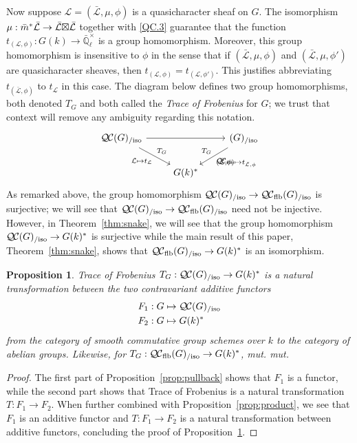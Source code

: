 \documentclass{amsart}
\theoremstyle{plain}
\newtheorem{proposition}[theorem]{Proposition}
\theoremstyle{definition}
\theoremstyle{remark}
\newcommand{\EE}{\mathbb{\bar Q}_\ell}
\newcommand{\Fq}{k}
\newcommand{\EEx}{\EE^\times}
\newcommand{\qcs}[1]{{\mathcal{#1}}}
\newcommand{\gqcs}[1]{{\mathcal{\bar #1}}}
\newcommand{\QC}{{\mathcal{Q\hskip-0.8pt C}}}
\newcommand{\lQC}{{\QC_\text{flb}}}
\newcommand{\lQCiso}[1]{\lQC(#1)_{/\text{iso}}}
\newcommand{\QCiso}[1]{\QC(#1)_{/\text{iso}}}
\newcommand{\trFrob}[1]{t_{#1}}
\newcommand{\TrFrob}[1]{T_{#1}}
\newcommand{\bm}{\bar{m}}
\newcommand{\tight}[3]{\hspace{-#1pt}{#2}\hspace{-#3pt}}
\newcommand{\LxL}{\text{$\gqcs{L} \tight{0}{\boxtimes}{0} \gqcs{L}$}}
\begin{document}
Now suppose $\qcs{L} = (\gqcs{L},\mu,\phi)$ is a quasicharacter sheaf on $G$.
The isomorphism $\mu : \bm^* \gqcs{L} \to \LxL$ together with
\ref{QC.3} guarantee
that the function $\trFrob{(\qcs{L},\phi)} : G(\Fq)\to \EEx$ is a group homomorphism.  
Moreover, this group homomorphism is insensitive to $\phi$ in the sense 
that if $(\gqcs{L},\mu,\phi)$ and $(\gqcs{L},\mu,\phi')$ are quasicharacter sheaves, then $\trFrob{(\qcs{L},\phi)} = \trFrob{(\qcs{L},\phi')}$. 
This justifies abbreviating $\trFrob{(\gqcs{L},\phi)}$ to $\trFrob{\qcs{L}}$ in this case.
The diagram below defines two group homomorphisms, both denoted $\TrFrob{G}$ and both called the \emph{Trace of Frobenius} for $G$; we trust that context will remove any ambiguity regarding this notation.
\[
\begin{tikzcd}
\QCiso{G} \arrow{rr} \arrow{dr}[swap]{\qcs{L} \mapsto t_{\qcs{L}}}{\TrFrob{G}} && \arrow{dl}[swap]{\TrFrob{G}}{(\gqcs{L},\phi) \mapsto t_{\gqcs{L},\phi}} \lQCiso{G} \\
& G(\Fq)^* & 
\end{tikzcd}
\]
As remarked above, the group homomorphism $\QCiso{G} \to \lQCiso{G}$ is surjective;
we will see that $\QCiso{G} \to \lQCiso{G}$ need not be injective.
However, in Theorem~\ref{thm:snake}, we will see that the group homomorphism $\QCiso{G} \to G(\Fq)^*$ is surjective
while the main result of this paper, Theorem~\ref{thm:snake}, 
shows that $\lQCiso{G} \to G(\Fq)^*$ is an isomorphism.

\begin{proposition}\label{prop:functorialG}
Trace of Frobenius $\TrFrob{G} : \QCiso{G} \to G(\Fq)^*$ is a natural transformation
between the two contravariant additive functors
\begin{align*}
F_1 : G &\mapsto \QCiso{G} \\
F_2 : G &\mapsto G(\Fq)^*
\end{align*}
from the category of smooth commutative group schemes over $\Fq$ to the category of abelian groups.
Likewise, for $\TrFrob{G} : \lQCiso{G} \to G(\Fq)^*$, {\it mut.\hskip-1pt mut.}
\end{proposition}

\begin{proof}
The first part of Proposition~\ref{prop:pullback} shows that $F_1$ is a functor,
while the second part shows that Trace of Frobenius is a natural transformation
$T: F_1 \to F_2$. When further combined with Proposition~\ref{prop:product},
we see that $F_1$ is an additive functor and $T: F_1 \to F_2$ is a natural
transformation between additive functors,
concluding the proof of Proposition~\ref{prop:functorialG}.
\end{proof}
\end{document}
